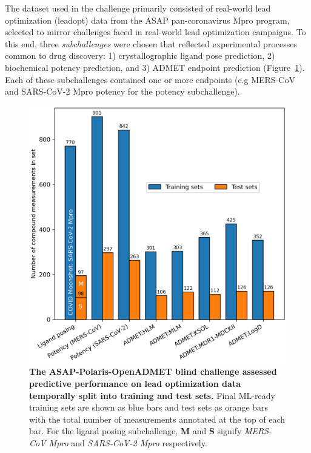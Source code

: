 \documentclass[journal=jcim,manuscript=article]{achemso}
\begin{document}
The dataset used in the challenge primarily consisted of real-world lead optimization (leadopt) data from the ASAP pan-coronavirus Mpro program, selected to mirror challenges faced in real-world lead optimization campaigns. To this end, three \textit{subchallenges} were chosen that reflected experimental processes common to drug discovery: 1) crystallographic ligand pose prediction, 2) biochemical potency prediction, and 3) ADMET endpoint prediction (Figure~\ref{fgr:datasets_overview}). Each of these subchallenges contained one or more endpoints (e.g MERS-CoV and SARS-CoV-2 Mpro potency for the potency subchallenge).


\begin{figure}
    \includegraphics[scale=0.5]{01_figs_introduction/datasets_overview.png}
  \caption{\textbf{The ASAP-Polaris-OpenADMET blind challenge assessed predictive performance on lead optimization data temporally split into training and test sets.} 
  Final ML-ready training sets are shown as blue bars and test sets as orange bars with the total number of measurements annotated at the top of each bar. For the ligand posing subchallenge, \textbf{M} and \textbf{S} signify \textit{MERS-CoV Mpro} and \textit{SARS-CoV-2 Mpro} respectively. }
  \label{fgr:datasets_overview}
\end{figure}
\end{document}
